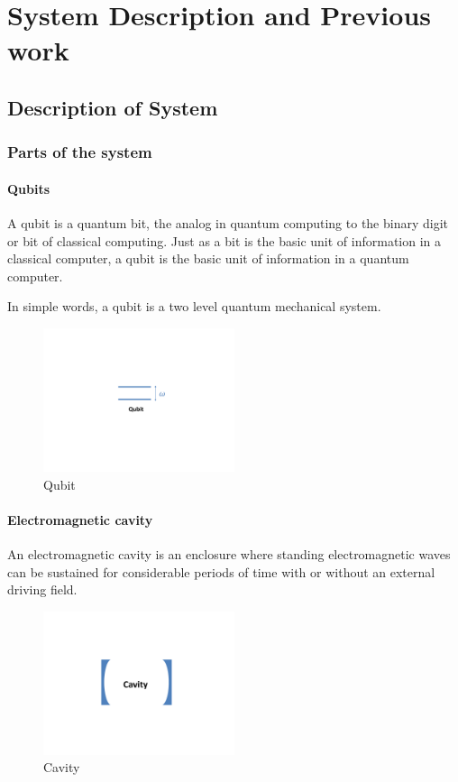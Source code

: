\chapter{System Description and Previous work}
\section{Description of System}
\subsection{Parts of the system}
\subsubsection{Qubits}
A qubit is a quantum bit, the analog in quantum computing to the binary digit or bit of classical computing. Just as a bit is the basic unit of information in a classical computer, a qubit is the basic unit of information in a quantum computer. \citep{Whatisqubit} 
\par
In simple words, a qubit is a two level quantum mechanical system.
\begin{figure}[h]
\centering
\includegraphics[width=0.5\textwidth]{Figr3a.pdf}
\caption{Qubit}
\label{fig:Figr3a}
\end{figure}


\subsubsection{Electromagnetic cavity}
An electromagnetic cavity  is an enclosure where standing electromagnetic waves can be sustained for considerable periods of time with or without an external driving field.%
\begin{figure}%
\centering
\includegraphics[width=0.5\textwidth]{Figr4a.pdf}
\caption{Cavity}
\label{fig:Figr4a}
\end{figure}

